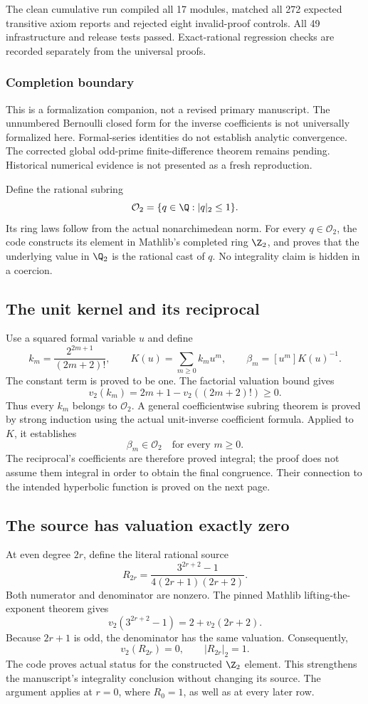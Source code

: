 The clean cumulative run compiled all 17 modules, matched all 272 expected transitive axiom reports and rejected eight invalid-proof controls. All 49 infrastructure and release tests passed. Exact-rational regression checks are recorded separately from the universal proofs.

\subsubsection*{Completion boundary}
This is a formalization companion, not a revised primary manuscript. The unnumbered Bernoulli closed form for the inverse coefficients is not universally formalized here. Formal-series identities do not establish analytic convergence. The corrected global odd-prime finite-difference theorem remains pending. Historical numerical evidence is not presented as a fresh reproduction.
\par\medskip
{}
Define the rational subring
\[
 \mathcal O_2=\{q\in\Q:|q|_2\leq1\}.
\]
Its ring laws follow from the actual nonarchimedean norm. For every $q\in\mathcal O_2$, the code constructs its element in Mathlib's completed ring $\Z_2$, and proves that the underlying value in $\Q_2$ is the rational cast of $q$. No integrality claim is hidden in a coercion.

\subsection*{The unit kernel and its reciprocal}
Use a squared formal variable $u$ and define
\[
 k_m=\frac{2^{2m+1}}{(2m+2)!},\qquad
 K(u)=\sum_{m\geq0}k_mu^m,\qquad
 \beta_m=[u^m]K(u)^{-1}.
\]
The constant term is proved to be one. The factorial valuation bound gives
\[
 v_2(k_m)=2m+1-v_2((2m+2)!)\geq0.
\]
Thus every $k_m$ belongs to $\mathcal O_2$. A general coefficientwise subring theorem is proved by strong induction using the actual unit-inverse coefficient formula. Applied to $K$, it establishes
\[
 \boxed{\beta_m\in\mathcal O_2\quad\text{for every }m\geq0.}
\]
The reciprocal's coefficients are therefore proved integral; the proof does not assume them integral in order to obtain the final congruence. Their connection to the intended hyperbolic function is proved on the next page.

\subsection*{The source has valuation exactly zero}
At even degree $2r$, define the literal rational source
\[
 R_{2r}=\frac{3^{2r+2}-1}{4(2r+1)(2r+2)}.
\]
Both numerator and denominator are nonzero. The pinned Mathlib lifting-the-exponent theorem gives
\[
 v_2(3^{2r+2}-1)=2+v_2(2r+2).
\]
Because $2r+1$ is odd, the denominator has the same valuation. Consequently,
\[
 \boxed{v_2(R_{2r})=0,\qquad |R_{2r}|_2=1.}
\]
The code proves actual  status for the constructed $\Z_2$ element. This strengthens the manuscript's integrality conclusion without changing its source. The argument applies at $r=0$, where $R_0=1$, as well as at every later row.

